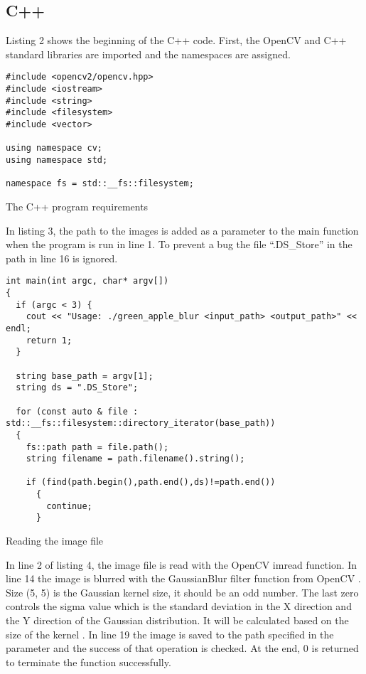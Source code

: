 \subsection{C++}
Listing 2 shows the beginning of the C++ code. First, the OpenCV and C++ standard libraries are imported and the namespaces are assigned.

\begin{listing}[H]
\begin{verbatim}
#include <opencv2/opencv.hpp>
#include <iostream>
#include <string>
#include <filesystem>
#include <vector>

using namespace cv;
using namespace std;

namespace fs = std::__fs::filesystem;
\end{verbatim}
\caption{The C++ program requirements}
\label{listing:c++requirements}
\end{listing}

In listing 3, the path to the images is added as a parameter to the main function when the program is run in line 1. To prevent a bug the file “.DS\_Store” in the path in line 16 is ignored.

\begin{listing}[H]
\begin{verbatim}
int main(int argc, char* argv[])
{
  if (argc < 3) {
    cout << "Usage: ./green_apple_blur <input_path> <output_path>" << endl;
    return 1;
  }

  string base_path = argv[1];
  string ds = ".DS_Store";

  for (const auto & file : std::__fs::filesystem::directory_iterator(base_path))
  {
    fs::path path = file.path();
    string filename = path.filename().string();

    if (find(path.begin(),path.end(),ds)!=path.end())
      {
        continue;
      }

\end{verbatim}
\caption{Reading the image file}
\label{listing:c++-read}
\end{listing}

In line 2 of listing 4, the image file is read with the OpenCV imread function. In line 14 the image is blurred with the GaussianBlur filter function from OpenCV \cite{gaussianblur}. Size (5, 5) is the Gaussian kernel size, it should be an odd number. The last zero controls the sigma value which is the standard deviation in the X direction and the Y direction of the Gaussian distribution. It will be calculated based on the size of the kernel \cite{gaussianblurtutorial}. In line 19 the image is saved to the path specified in the parameter and the success of that operation is checked. At the end, 0 is returned to terminate the function successfully.

